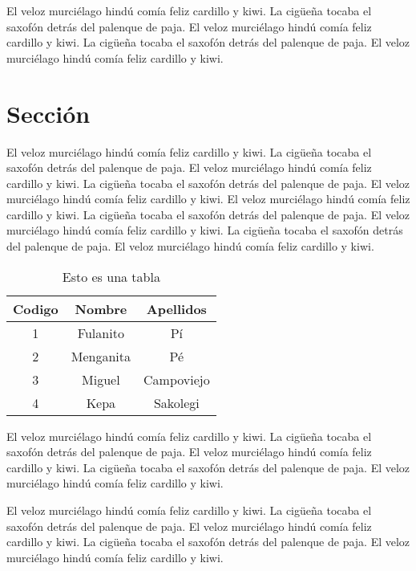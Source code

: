 El veloz murciélago hindú comía feliz cardillo y kiwi.  La cigüeña tocaba el saxofón detrás del palenque de paja.  El veloz murciélago hindú comía feliz cardillo y kiwi.  La cigüeña tocaba el saxofón detrás del palenque de paja.  El veloz murciélago hindú comía feliz cardillo y kiwi.

\section{Sección} 


El veloz murciélago hindú comía feliz cardillo y kiwi.  La cigüeña tocaba el saxofón detrás del palenque de paja.  El veloz murciélago hindú comía feliz cardillo y kiwi.  La cigüeña tocaba el saxofón detrás del palenque de paja.  El veloz murciélago hindú comía feliz cardillo y kiwi. El veloz murciélago hindú comía feliz cardillo y kiwi.  La cigüeña tocaba el saxofón detrás del palenque de paja.  El veloz murciélago hindú comía feliz cardillo y kiwi.  La cigüeña tocaba el saxofón detrás del palenque de paja.  El veloz murciélago hindú comía feliz cardillo y kiwi.

\begin{table}
\begin{center}
\begin{tabular}{|c|c|c|}
\hline Codigo & Nombre & Apellidos \\ 
\hline\hline 1 & Fulanito & Pí \\ 
\hline 2 & Menganita & Pé \\ 
\hline 3 & Miguel & Campoviejo \\ 
\hline 4 & Kepa & Sakolegi \\ 
\hline 
\end{tabular} 
\caption{Esto es una tabla}
\label{tbTabla4}
\end{center}
\end{table}

El veloz murciélago hindú comía feliz cardillo y kiwi.  La cigüeña tocaba el saxofón detrás del palenque de paja.  El veloz murciélago hindú comía feliz cardillo y kiwi.  La cigüeña tocaba el saxofón detrás del palenque de paja.  El veloz murciélago hindú comía feliz cardillo y kiwi.

El veloz murciélago hindú comía feliz cardillo y kiwi.  La cigüeña tocaba el saxofón detrás del palenque de paja.  El veloz murciélago hindú comía feliz cardillo y kiwi.  La cigüeña tocaba el saxofón detrás del palenque de paja.  El veloz murciélago hindú comía feliz cardillo y kiwi.


\newpage
%
